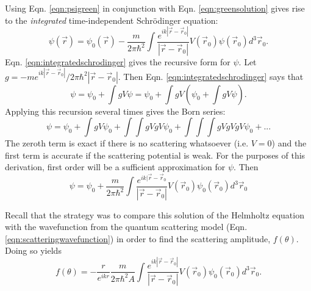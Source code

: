 Using Eqn. \ref{eqn:psigreen} in conjunction with Eqn. \ref{eqn:greensolution} gives rise to the \emph{integrated} time-independent Schr\"{o}dinger equation:
%
\begin{equation} \label{eqn:integratedschrodinger}
\psi(\vec{r})=\psi_0 (\vec{r})-\frac{m}{2\pi\hbar^2}\int\frac{e^{ik|\vec{r}-\vec{r}_0|}}{|\vec{r}-\vec{r}_0|}V(\vec{r}_0)\psi(\vec{r}_0)d^3\vec{r}_0.
\end{equation}
%
Eqn. \ref{eqn:integratedschrodinger} gives the recursive form for $\psi$. Let $g=-me^{ik|\vec{r}-\vec{r}_0|}/2\pi\hbar^2|\vec{r}-\vec{r}_0|$. Then Eqn. \ref{eqn:integratedschrodinger} says that
%
\begin{equation} \nonumber
\psi=\psi_0+\int gV\psi = \psi_0+\int gV (\psi_0+\int gV\psi).
\end{equation}
%
Applying this recursion several times gives the Born series:
%
\begin{equation}\nonumber
\psi=\psi_0+\int gV\psi_0+\int \int gVgV\psi_0 + \int \int \int gVgVgV\psi_0 + ...
\end{equation}
%
The zeroth term is exact if there is no scattering whatsoever (i.e. $V=0$) and the first term is accurate if the scattering potential is weak. For the purposes of this derivation, first order will be a sufficient approximation for $\psi$. Then
%
\begin{equation} \nonumber
\psi=\psi_0+\frac{m}{2\pi\hbar^2}\int\frac{e^{ik|\vec{r}-\vec{r}_0}}{|\vec{r}-\vec{r}_0|}V(\vec{r}_0)\psi_0(\vec{r}_0) d^3\vec{r}_0
\end{equation}

Recall that the strategy was to compare this solution of the Helmholtz equation with the wavefunction from the quantum scattering model (Eqn. \ref{eqn:scatteringwavefunction}) in order to find the scattering amplitude, $f(\theta)$. Doing so yields
%
\begin{equation} \nonumber
f(\theta)=-\frac{r}{e^{ikr}}\frac{m}{2\pi\hbar^2A}\int\frac{e^{ik|\vec{r}-\vec{r}_0|}}{|\vec{r}-\vec{r}_0|}V(\vec{r}_0)\psi_0(\vec{r}_0)d^3\vec{r}_0.
\end{equation}
%

